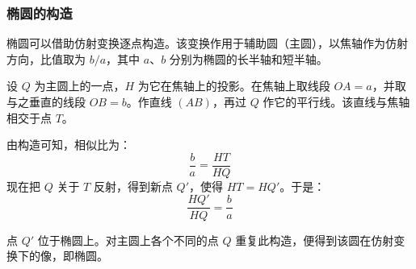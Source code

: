 \subsubsection{椭圆的构造}

椭圆可以借助仿射变换逐点构造。该变换作用于辅助圆（主圆），以焦轴作为仿射方向，比值取为 $b/a$，其中 $a$、$b$ 分别为椭圆的长半轴和短半轴。

设 $Q$ 为主圆上的一点，$H$ 为它在焦轴上的投影。在焦轴上取线段 $OA = a$，并取与之垂直的线段 $OB = b$。作直线 $(AB)$，再过 $Q$ 作它的平行线。该直线与焦轴相交于点 $T$。

由构造可知，相似比为：
\[
\frac{b}{a} = \frac{HT}{HQ}
\]
现在把 $Q$ 关于 $T$ 反射，得到新点 $Q'$，使得 $HT = HQ'$。于是：
\[
\frac{HQ'}{HQ} = \frac{b}{a}
\]

点 $Q'$ 位于椭圆上。对主圆上各个不同的点 $Q$ 重复此构造，便得到该圆在仿射变换下的像，即椭圆。

